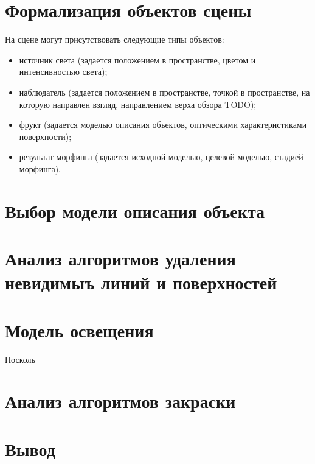     \section{Формализация объектов сцены}
    На сцене могут присутствовать следующие типы объектов:
    \begin{itemize}
    	\item источник света (задается положением в пространстве, цветом и интенсивностью света);
    	\item наблюдатель (задается положением в пространстве, точкой в пространстве, на которую направлен взгляд, направлением верха обзора TODO);
    	\item фрукт (задается моделью описания объектов, оптическими характеристиками поверхности);
    	\item результат морфинга (задается исходной моделью, целевой моделью, стадией морфинга). 
    \end{itemize}
    
    \section{Выбор модели описания объекта}
    
    \section{Анализ алгоритмов удаления невидимыъ линий и поверхностей}
    
    \section{Модель освещения}
    
    Посколь
    
    \section{Анализ алгоритмов закраски}
    
\section*{Вывод}

\clearpage